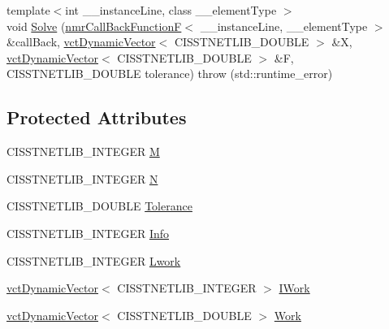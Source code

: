 {\bf }\par
\begin{DoxyCompactItemize}
\item 
{\footnotesize template$<$int \+\_\+\+\_\+instance\+Line, class \+\_\+\+\_\+element\+Type $>$ }\\void \hyperlink{classnmr_l_s_non_lin_solver_a79af0b924ff834cf31df5e20ae261c59}{Solve} (\hyperlink{classnmr_call_back_function_f}{nmr\+Call\+Back\+Function\+F}$<$ \+\_\+\+\_\+instance\+Line, \+\_\+\+\_\+element\+Type $>$ \&call\+Back, \hyperlink{classvct_dynamic_vector}{vct\+Dynamic\+Vector}$<$ C\+I\+S\+S\+T\+N\+E\+T\+L\+I\+B\+\_\+\+D\+O\+U\+B\+L\+E $>$ \&X, \hyperlink{classvct_dynamic_vector}{vct\+Dynamic\+Vector}$<$ C\+I\+S\+S\+T\+N\+E\+T\+L\+I\+B\+\_\+\+D\+O\+U\+B\+L\+E $>$ \&F, C\+I\+S\+S\+T\+N\+E\+T\+L\+I\+B\+\_\+\+D\+O\+U\+B\+L\+E tolerance)  throw (std\+::runtime\+\_\+error)
\end{DoxyCompactItemize}

\subsection*{Protected Attributes}
\begin{DoxyCompactItemize}
\item 
C\+I\+S\+S\+T\+N\+E\+T\+L\+I\+B\+\_\+\+I\+N\+T\+E\+G\+E\+R \hyperlink{classnmr_l_s_non_lin_solver_ae149f93166d678e971025b9c515426a5}{M}
\item 
C\+I\+S\+S\+T\+N\+E\+T\+L\+I\+B\+\_\+\+I\+N\+T\+E\+G\+E\+R \hyperlink{classnmr_l_s_non_lin_solver_a5ee3cc88525a1b1f9749729b676135fe}{N}
\item 
C\+I\+S\+S\+T\+N\+E\+T\+L\+I\+B\+\_\+\+D\+O\+U\+B\+L\+E \hyperlink{classnmr_l_s_non_lin_solver_a4becb9d9f32e92e2bd373a353ddb7b81}{Tolerance}
\item 
C\+I\+S\+S\+T\+N\+E\+T\+L\+I\+B\+\_\+\+I\+N\+T\+E\+G\+E\+R \hyperlink{classnmr_l_s_non_lin_solver_a592efff84d1cb170d3669b9f968db99b}{Info}
\item 
C\+I\+S\+S\+T\+N\+E\+T\+L\+I\+B\+\_\+\+I\+N\+T\+E\+G\+E\+R \hyperlink{classnmr_l_s_non_lin_solver_a987d725eb629e7f092797e58caac9b73}{Lwork}
\item 
\hyperlink{classvct_dynamic_vector}{vct\+Dynamic\+Vector}$<$ C\+I\+S\+S\+T\+N\+E\+T\+L\+I\+B\+\_\+\+I\+N\+T\+E\+G\+E\+R $>$ \hyperlink{classnmr_l_s_non_lin_solver_a0c563e7168d837d88c9ecfe256bd4c16}{I\+Work}
\item 
\hyperlink{classvct_dynamic_vector}{vct\+Dynamic\+Vector}$<$ C\+I\+S\+S\+T\+N\+E\+T\+L\+I\+B\+\_\+\+D\+O\+U\+B\+L\+E $>$ \hyperlink{classnmr_l_s_non_lin_solver_a7ba55974c126ea40c19938c09c6ac730}{Work}
\end{DoxyCompactItemize}


